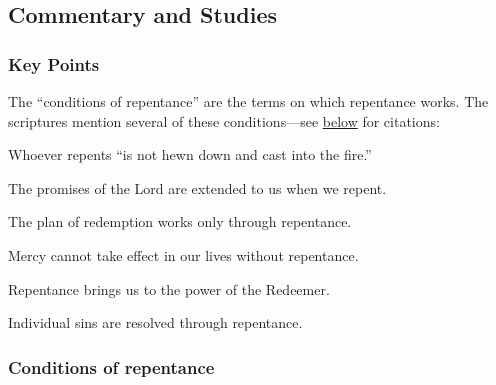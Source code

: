 	
	
\subsection{Commentary and Studies} %
	\label{CONDITION-COMMENTARY}

	\subsubsection{Key Points}
		\label{CONDITION-KEYS}
	
		\begin{compactitem}
			\item The ``conditions of repentance'' are the terms on which repentance works. The scriptures mention several of these conditions---see \hyperref[CONDITION-repentance]{below} for citations:
				\begin{compactitem}
					\item Whoever repents ``is not hewn down and cast into the fire.''
					\item The promises of the Lord are extended to us when we repent.
					\item The plan of redemption works only through repentance.
					\item Mercy cannot take effect in our lives without repentance.
					\item Repentance brings us to the power of the Redeemer.
					\item Individual sins are resolved through repentance.
					\item 
				\end{compactitem}
		\end{compactitem}
	
	\subsubsection{Conditions of repentance}
		\label{CONDITION-repentance}
		
